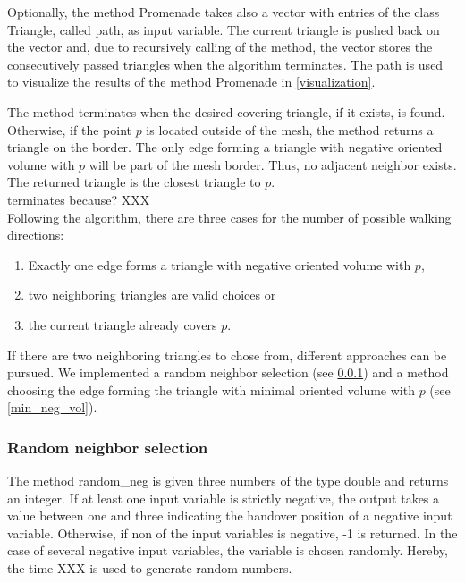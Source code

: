 \documentclass[10pt]{article}
\begin{document}
Optionally, the method {\ttfamily Promenade} takes also a vector with entries of the class {\ttfamily Triangle}, called path, as input variable. The current triangle is pushed back on the vector and, due to recursively calling of the method, the vector stores the consecutively passed triangles when the algorithm terminates. The path is used to visualize the results of the method {\ttfamily Promenade} in \ref{visualization}.

The method terminates when the desired covering triangle, if it exists, is found. Otherwise, if the point $p$ is located outside of the mesh, the method returns a triangle on the border. The only edge forming a triangle with negative oriented volume with $p$ will be part of the mesh border. Thus, no adjacent neighbor exists. The returned triangle is the closest triangle to $p$.\\

terminates because? XXX\\

Following the algorithm, there are three cases for the number of possible walking directions:
\begin{enumerate}
	\item Exactly one edge forms a triangle with negative oriented volume with $p$,
	\item two neighboring triangles are valid choices or
	\item the current triangle already covers $p$.
\end{enumerate}
If there are two neighboring triangles to chose from, different approaches can be pursued. We implemented a random neighbor selection (see \ref{ran_neighb_sel}) and a method choosing the edge forming the triangle with minimal oriented volume with $p$ (see \ref{min_neg_vol}).

\subsubsection{Random neighbor selection} \label{ran_neighb_sel}

The method {\ttfamily random\_neg} is given three numbers of the type {\ttfamily double} and returns an integer. If at least one input variable is strictly negative, the output takes a value between one and three indicating the handover position of a negative input variable. Otherwise, if non of the input variables is negative, -1 is returned. In the case of several negative input variables, the variable is chosen randomly. Hereby, the time XXX is used to generate random numbers.
\end{document}
